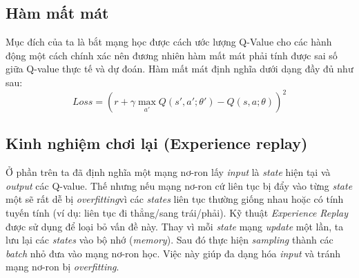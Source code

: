 \documentclass[12pt,a4paper]{report}
\begin{document}
\subsection{Hàm mất mát}
Mục đích của ta là bắt mạng học được cách ước lượng Q-Value cho các hành động một
cách chính xác nên đương nhiên hàm mất mát phải tính được sai số giữa Q-value thực tế và
dự đoán. Hàm mất mát định nghĩa dưới dạng đầy đủ như sau: $$Loss = (r+\gamma\max_{a'}Q(s', a'; \theta') - Q(s, a; \theta))^2$$
\subsection{Kinh nghiệm chơi lại (Experience replay)}
Ở phần trên ta đã định nghĩa một mạng nơ-ron lấy \textit{input} là \textit{state} hiện tại và \textit{output} các
Q-value. Thế nhưng nếu mạng nơ-ron cứ liên tục bị đẩy vào từng \textit{state} một sẽ rất dễ bị
\textit{overfitting}vì các \textit{states} liên tục thường giống nhau hoặc có tính tuyến tính (ví dụ: liên tục đi
thẳng/sang trái/phải). Kỹ thuật \textit{Experience Replay} được sử dụng để loại bỏ vấn đề này. Thay
vì mỗi \textit{state} mạng \textit{update} một lần, ta lưu lại các \textit{states} vào bộ nhớ (\textit{memory}). Sau đó thực
hiện \textit{sampling} thành các \textit{batch} nhỏ đưa vào mạng nơ-ron học. Việc này giúp đa dạng hóa
\textit{input} và tránh mạng nơ-ron bị \textit{overfitting}.
\end{document}
